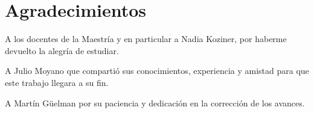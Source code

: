 



\ifPDF

\usepackage[hyphenation,homeoarchy,homeoarchywordcolor=orange, homeoarchycharcolor=orange,draft]{impnattypo}
\usepackage[allcolors=magenta, colorlinks, unicode]{hyperref}
\usepackage{easyReview}
\usepackage{hyperxmp}

	\else
	\ifBNPDF
	\usepackage[width=18truecm,height=25.5truecm,cam,center]{crop}
	\newcommand*\infofont[1]{\sf{\footnotesize #1 (majotorrico13@gmail.com)}}
	\crop[font=infofont]
	\usepackage[hidelinks, unicode]{hyperref}
	\usepackage{hyperxmp}
	
		\else
		\ifPNGEPUB
		\usepackage[hidelinks, unicode]{hyperref}
			\else
			\ifHTMLEPUB
			\usepackage[allcolors=blue,colorlinks,hyperindex=true,unicode]{hyperref}
			\fi
		\fi
	\fi
\fi


\frontmatter


\tableofcontents

%
%
%
%
%
%
%
%



\chapter{Agradecimientos}

A los docentes de la Maestría y en particular a Nadia Koziner, por haberme devuelto la alegría de estudiar.

A Julio Moyano que compartió sus conocimientos, experiencia y amistad para que este trabajo llegara a su fin.

A Martín Güelman por su paciencia y dedicación en la corrección de los avances.

